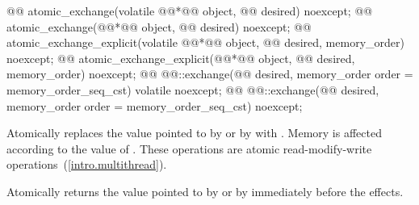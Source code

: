 %
%
%
\begin{itemdecl}
@@ atomic_exchange(volatile @@*@\itcorr[-1]@ object, @@ desired) noexcept;
@@ atomic_exchange(@@*@\itcorr[-1]@ object, @@ desired) noexcept;
@@ atomic_exchange_explicit(volatile @@*@\itcorr[-1]@ object, @@ desired, memory_order) noexcept;
@@ atomic_exchange_explicit(@@*@\itcorr[-1]@ object, @@ desired, memory_order) noexcept;
@@ @@::exchange(@@ desired, memory_order order = memory_order_seq_cst) volatile noexcept;
@@ @@::exchange(@@ desired, memory_order order = memory_order_seq_cst) noexcept;
\end{itemdecl}

\begin{itemdescr}
\pnum
\effects Atomically replaces the value pointed to by  or by 
with .
Memory is affected according to the value of .
These operations are atomic read-modify-write operations~(\ref{intro.multithread}).

\pnum
\returns Atomically returns the value pointed to by  or by  immediately before the effects.
\end{itemdescr}

